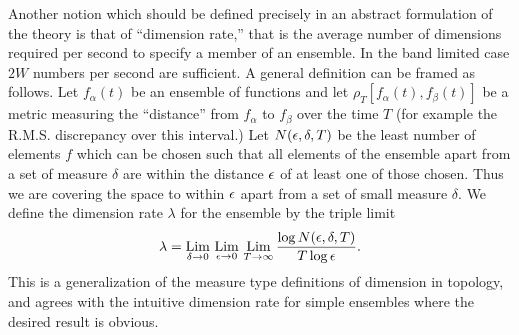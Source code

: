 Another notion which should be defined precisely in an abstract formulation
of the theory is that of ``dimension rate,'' that is the average number of
dimensions required per second to specify a member of an ensemble.  In the
band limited case $2W$ numbers per second are sufficient.  A general definition
can be framed as follows.  Let $f_\alpha(t)$ be an ensemble of functions and
let $\rho_T[f_\alpha(t),f_\beta(t)]$ be a metric measuring the ``distance''
from $f_\alpha$ to $f_\beta$ over the time $T$ (for example the R.M.S.
discrepancy over this interval.) Let $N(\epsilon,\delta,T)$ be the least
number of elements $f$ which can be chosen such that all elements of the
ensemble apart from a set of measure $\delta$ are within the distance
$\epsilon$ of at least one of those chosen.  Thus we are covering the space
to within $\epsilon$ apart from a set of small measure $\delta$.  We define the
dimension rate $\lambda$ for the ensemble by the triple limit
$$
\lambda=\lim_{\delta\to0}\,\lim_{\eps\to0}\,\lim_{T\to\infty}
	\frac{\log N(\eps,\delta,T)}{T\log\eps}.
$$
This is a generalization of the measure type definitions of dimension in
topology, and agrees with the intuitive dimension rate for simple
ensembles where the desired result is obvious.

\endappendix
